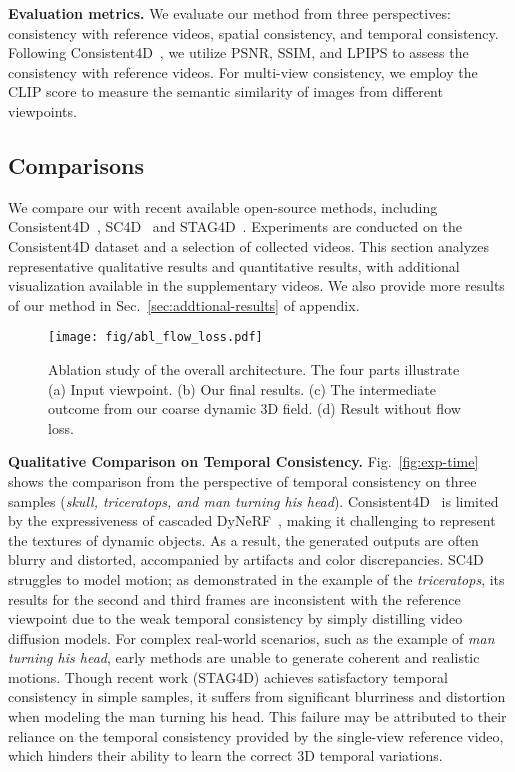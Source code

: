\textbf{Evaluation metrics.} We evaluate our method from three perspectives: consistency with reference videos, spatial consistency, and temporal consistency. Following Consistent4D~\citep{jiang2023consistent4d}, we utilize PSNR, SSIM, and LPIPS to assess the consistency with reference videos. For multi-view consistency, we employ the CLIP score to measure the semantic similarity of images from different viewpoints. 




\subsection{Comparisons} We compare our \methodname with recent available open-source methods, including Consistent4D~\cite{jiang2023consistent4d}, SC4D~\cite{wu2024sc4d} and STAG4D~\cite{zeng2024stag4d}. Experiments are conducted on the Consistent4D dataset and a selection of collected videos. This section analyzes representative qualitative results and quantitative results, with additional visualization available in the supplementary videos. We also provide more results of our method in Sec.~\ref{sec:addtional-results} of appendix.


\begin{figure}[b]
    \centering
    \texttt{[image: fig/abl\_flow\_loss.pdf]}
    \caption{Ablation study of the overall architecture. The four parts illustrate (a) Input viewpoint. (b) Our final results. (c) The intermediate outcome from our coarse dynamic 3D field. (d) Result without flow loss.}
    \label{fig:ablation}
\end{figure}
\textbf{Qualitative Comparison on Temporal Consistency.} Fig.~\ref{fig:exp-time} shows the comparison from the perspective of temporal consistency on three samples (\textit{skull, triceratops, and man turning his head}). Consistent4D~\cite{jiang2023consistent4d} is limited by the expressiveness of cascaded DyNeRF~\cite{li2022neural3dvideo}, making it challenging to represent the textures of dynamic objects. As a result, the generated outputs are often blurry and distorted, accompanied by artifacts and color discrepancies. SC4D struggles to model motion; as demonstrated in the example of the \textit{triceratops}, its results for the second and third frames are inconsistent with the reference viewpoint due to the weak temporal consistency by simply distilling video diffusion models. For complex real-world scenarios, such as the example of \textit{man turning his head}, early methods are unable to generate coherent and realistic motions. Though recent work (STAG4D) achieves satisfactory temporal consistency in simple samples, it suffers from significant blurriness and distortion when modeling the man turning his head. This failure may be attributed to their reliance on the temporal consistency provided by the single-view reference video, which hinders their ability to learn the correct 3D temporal variations.

